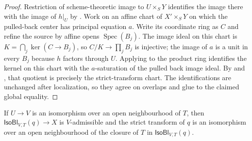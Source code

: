 \begin{proof}
  Restriction of scheme-theoretic image to $U\times_SY$ identifies the image
  there with the image of $h|_U$ by
  .  Work on an affine chart of
  $X'\times_SY$ on which the pulled-back center has principal equation $a$.
  Write its coordinate ring as $C$ and refine the source by affine opens
  $\operatorname{Spec}(B_j)$.  The image ideal on this chart is
  $K=\bigcap_j\ker(C\to B_j)$, so $C/K\to\prod_jB_j$ is injective; the image
  of $a$ is a unit in every $B_j$ because $h$ factors through $U$.  Applying
   to the product ring
  identifies the kernel on this chart with the $a$-saturation of the pulled
  back image ideal.  By
   and
  , that
  quotient is precisely the strict-transform chart.  The identifications are
  unchanged after localization, so they agree on overlaps and glue to the
  claimed global equality.
\end{proof}

\begin{lemma}
  \label{lemma:nagata-isomorphism-near-closure}

  If $U\to V$ is an isomorphism over an open neighbourhood of $T$, then
  $\mathsf{IsoBl}_{V,T}(q)\to X$ is $V$-admissible and the strict transform
  of $q$ is an isomorphism over an open neighbourhood of the closure of $T$
  in $\mathsf{IsoBl}_{V,T}(q)$.
\end{lemma}

